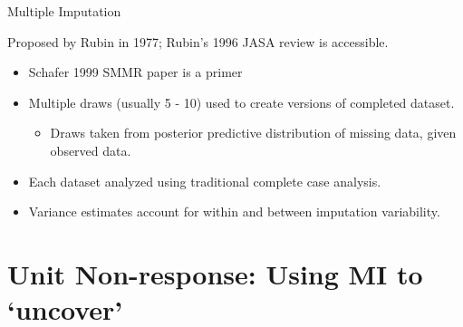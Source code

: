 \documentclass[11pt,handout]{beamer}
\begin{document}
\begin{frame}{Multiple Imputation}

Proposed by Rubin in 1977; Rubin's 1996 JASA review is accessible.

\begin{itemize}

   \item Schafer 1999 SMMR paper is a primer


   \item Multiple draws (usually 5 - 10) used to create versions of completed dataset.

\begin{itemize}
   \normalsize
   \item Draws taken from posterior predictive distribution of missing data, given observed data.

\end{itemize}


   \item Each dataset analyzed using traditional complete case analysis.


  \item Variance estimates account for within and between imputation variability.
  
\end{itemize}
	
\end{frame}

 
\section{Unit Non-response: Using MI to `uncover'}
\end{document}
